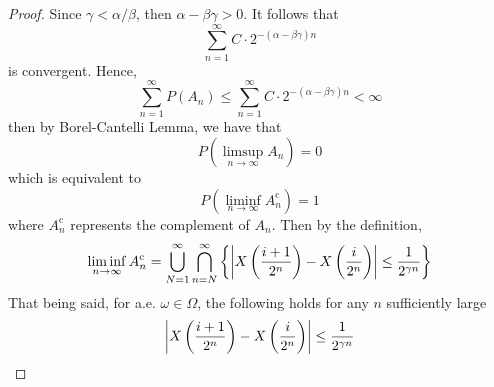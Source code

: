 \documentclass{homework}
\begin{document}
\begin{subproblem}
        \item
        \begin{proof}
            Since $\gamma<\alpha/\beta$, then $\alpha-\beta\gamma>0$.
            It follows that
            \[\sum_{n=1}^\infty C\cdot 2^{-(\alpha-\beta\gamma)n}\]
            is convergent. Hence,
            \[\sum_{n=1}^\infty P(A_n)
            \leq\sum_{n=1}^\infty C\cdot 2^{-(\alpha-\beta\gamma)n}
            <\infty\]
            then by Borel-Cantelli Lemma, we have that
            \[P\left(\limsup_{n\to\infty}A_n\right)=0\]
            which is equivalent to
            \[P\left(\liminf_{n\to\infty}A_n^\mathrm c\right)=1\]
            where $A_n^\mathrm c$ represents the complement of $A_n$.
            Then by the definition,
            \[\liminf_{n\to\infty}A_n^\mathrm c
            =\bigcup_{N=1}^\infty\bigcap_{n=N}^\infty
            \left\{\left|X\left(\frac{i+1}{2^n}\right)-X\left(\frac{i}{2^n}\right)\right|\leq\frac{1}{2^{\gamma n}}\right\}\]
            That being said, for a.e. $\omega\in\Omega$, the following
            holds for any $n$ sufficiently large
            \[\left|X\left(\frac{i+1}{2^n}\right)-X\left(\frac{i}{2^n}\right)\right|\leq\frac{1}{2^{\gamma n}}\]
        \end{proof}
    \end{subproblem}
\end{document}

